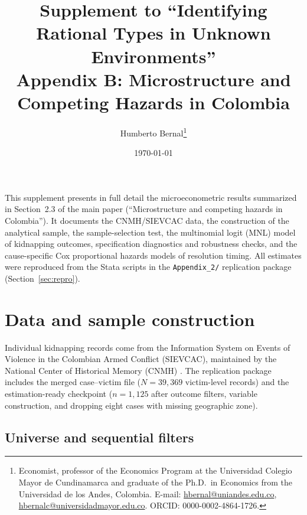 \documentclass[12pt]{article}
\numberwithin{equation}{section}
\numberwithin{table}{section}
\begin{document}
\title{Supplement to ``Identifying Rational Types in Unknown Environments''\\
Appendix B: Microstructure and Competing Hazards in Colombia}
\author{Humberto Bernal\thanks{Economist, professor of the Economics Program at the Universidad Colegio Mayor de Cundinamarca and graduate of the Ph.D.\ in Economics from the Universidad de los Andes, Colombia. E-mail: \href{mailto:hbernal@uniandes.edu.co}{hbernal@uniandes.edu.co}, \href{mailto:hbernalc@universidadmayor.edu.co}{hbernalc@universidadmayor.edu.co}. ORCID: 0000-0002-4864-1726.}}
\date{\today}
\maketitle

\newpage

\noindent
This supplement presents in full detail the microeconometric results
summarized in Section~2.3 of the main paper (``Microstructure and competing
hazards in Colombia''). It documents the CNMH/SIEVCAC data, the construction
of the analytical sample, the sample-selection test, the multinomial logit
(MNL) model of kidnapping outcomes, specification diagnostics and robustness
checks, and the cause-specific Cox proportional hazards models of resolution
timing. All estimates were reproduced from the Stata scripts in the
\texttt{Appendix\_2/} replication package (Section~\ref{sec:repro}).

\section{Data and sample construction}
\label{sec:data}

Individual kidnapping records come from the Information System on Events of
Violence in the Colombian Armed Conflict (SIEVCAC), maintained by the
National Center of Historical Memory (CNMH) \citep{cnmh_datos,CNMH2013}.
The replication package includes the merged case--victim file
 ($N=39{,}369$ victim-level records) and the
estimation-ready checkpoint  ($n=1{,}125$
after outcome filters, variable construction, and dropping eight cases with
missing geographic zone).

\subsection{Universe and sequential filters}
\end{document}
